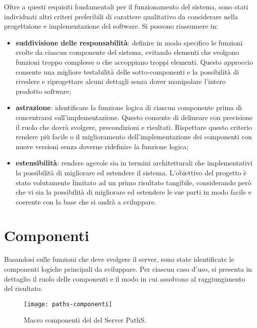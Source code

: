 Oltre a questi requisiti fondamentali per il funzionamento del sistema, sono stati individuati altri criteri preferibili di carattere qualitativo da considerare nella progettzione e implementazione del software. Si possono riassumere in:
\begin{itemize}
\item \textbf{suddivisione delle responsabilità}: definire in modo specifico le funzioni svolte da ciascun componente del sistema, evitando elementi che svolgono funzioni troppo complesse o che accoppiano troppi elementi. Questo approccio consente una migliore testabilità delle sotto-componenti e la possibilità di rivedere e riprogettare alcuni dettagli senza dover manipolare l'intero prodotto software;
\item \textbf{astrazione}: identificare la funzione logica di ciascun componente prima di concentrarsi sull'implementazione. Questo consente di delineare con precisione il ruolo che dovrà svolgere, precondizioni e risultati. Rispettare questo criterio rendere più facile o il miglioramento dell'implementazione dei componenti con nuove versioni senza doverne ridefinire la funzione logica;
\item \textbf{estensibilità}: rendere agevole sia in termini architetturali che implementativi la possibilità di migliorare ed estendere il sistema. L'obiettivo del progetto è stato volutamente limitato ad un primo risultato tangibile, considerando però che vi sia la possibilità di migliorare ed estendere le sue parti in modo facile e coerente con la base che si andrà a sviluppare.
\end{itemize}

\section{Componenti}
Basandosi sulle funzioni che deve svolgere il server, sono state identificate le componenti logiche principali da sviluppare. Per ciascun caso d'uso, si presenta in dettaglio il ruolo delle componenti e il modo in cui assolvono al raggiungimento del risultato.

\begin{figure}[ht]
  \centering
  \texttt{[image: paths-componenti]}
  \caption{\footnotesize{Macro componenti del del Server PathS.}}
  \label{fig:paths-general}
\end{figure}


